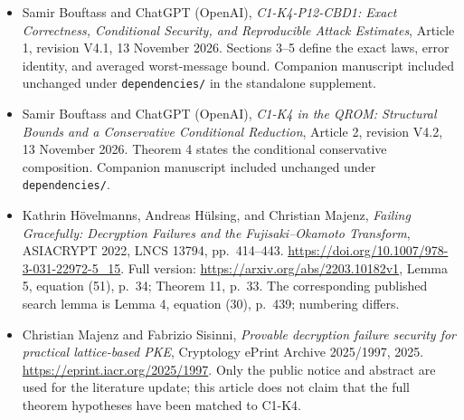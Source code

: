 \documentclass[11pt,a4paper]{article}
\providecommand{\tightlist}{\setlength{\itemsep}{0pt}\setlength{\parskip}{0pt}}
\begin{document}
\begin{itemize}
\tightlist
\item
  Samir Bouftass and ChatGPT (OpenAI), \emph{C1-K4-P12-CBD1: Exact Correctness, Conditional Security, and Reproducible Attack Estimates}, Article 1, revision V4.1, 13 November 2026. Sections 3--5 define the exact laws, error identity, and averaged worst-message bound. Companion manuscript included unchanged under \nolinkurl{dependencies/} in the standalone supplement.
\item
  Samir Bouftass and ChatGPT (OpenAI), \emph{C1-K4 in the QROM: Structural Bounds and a Conservative Conditional Reduction}, Article 2, revision V4.2, 13 November 2026. Theorem 4 states the conditional conservative composition. Companion manuscript included unchanged under \nolinkurl{dependencies/}.
\item
  Kathrin Hövelmanns, Andreas Hülsing, and Christian Majenz, \emph{Failing Gracefully: Decryption Failures and the Fujisaki--Okamoto Transform}, ASIACRYPT 2022, LNCS 13794, pp.~414--443. \url{https://doi.org/10.1007/978-3-031-22972-5_15}. Full version: \url{https://arxiv.org/abs/2203.10182v1}, Lemma 5, equation (51), p.~34; Theorem 11, p.~33. The corresponding published search lemma is Lemma 4, equation (30), p.~439; numbering differs.
\item
  Christian Majenz and Fabrizio Sisinni, \emph{Provable decryption failure security for practical lattice-based PKE}, Cryptology ePrint Archive 2025/1997, 2025. \url{https://eprint.iacr.org/2025/1997}. Only the public notice and abstract are used for the literature update; this article does not claim that the full theorem hypotheses have been matched to C1-K4.
\end{itemize}
\end{document}
